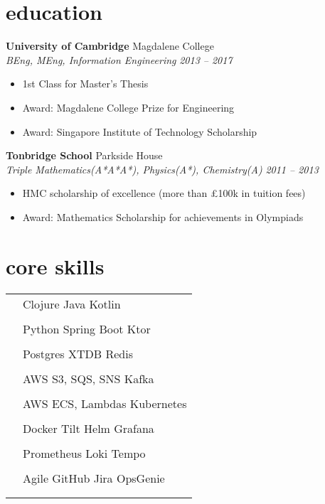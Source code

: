 \documentclass[12pt]{article}
\newcommand{\entry}[4]{{{\textbf{#1}}} \hfill #3 \\ #2 \hfill #4}
\newcommand{\tableentry}[3]{\textsc{#1} & #2\expandafter\ifstrequal\expandafter{#3}{}{\\}{\\[6pt]}}
\begin{document}
    \begin{paracol}{2}

        \section{education}

        \entry{University of Cambridge}{\textit{BEng, MEng, Information Engineering}}{Magdalene College}{\textit{2013 -- 2017}}
        \begin{itemize}[noitemsep,leftmargin=5mm,rightmargin=0mm,topsep=0pt]
            \item 1st Class for Master's Thesis
            \item Award: Magdalene College Prize for Engineering
            \item Award: Singapore Institute of Technology Scholarship
        \end{itemize}

        \smallskip
        \entry{Tonbridge School}{\textit{Triple Mathematics(A*A*A*), Physics(A*), Chemistry(A)}}{Parkside House}{\textit{2011 -- 2013}}
        \begin{itemize}[noitemsep,leftmargin=5mm,rightmargin=0mm,topsep=0pt]
            \item HMC scholarship of excellence (more than £100k in tuition fees)
            \item Award: Mathematics Scholarship for achievements in Olympiads
        \end{itemize}
        \switchcolumn

        \section{core skills}
        \bigskip
        \begin{flushleft}
            \begin{supertabular}{rl}
                \tableentry{\footnotesize\faCode}{Clojure \textperiodcentered{} Java \textperiodcentered{} Kotlin }{}
                \tableentry{}{Python \textperiodcentered{} Spring Boot \textperiodcentered{} Ktor}{}
                \tableentry{\footnotesize\faDatabase \hspace{0.7mm}}{Postgres \textperiodcentered{} XTDB \textperiodcentered{} Redis}{}
                \tableentry{}{AWS S3, SQS, SNS \textperiodcentered{} Kafka}{}

                \tableentry{\footnotesize\faDocker}{AWS ECS, Lambdas \textperiodcentered{} Kubernetes}{}
                \tableentry{}{Docker  \textperiodcentered{} Tilt \textperiodcentered{} Helm  \textperiodcentered{} Grafana}{}
                \tableentry{}{Prometheus \textperiodcentered{} Loki \textperiodcentered{} Tempo }{}
                \tableentry{\footnotesize\faAtlassian}{Agile \textperiodcentered{} GitHub \textperiodcentered{} Jira \textperiodcentered{} OpsGenie}{}
            \end{supertabular}
        \end{flushleft}
    \end{paracol}
\end{document}

